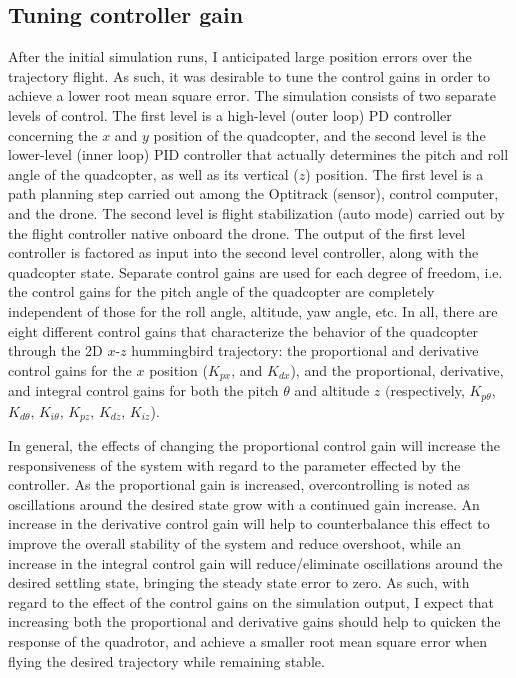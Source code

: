 \subsection{Tuning controller gain} %
After the initial simulation runs, I anticipated large position errors over the trajectory flight. As such, it was desirable to tune the control gains in order to achieve a lower root mean square error. The simulation consists of two separate levels of control. The first level is a high-level (outer loop) PD controller concerning the $x$ and $y$ position of the quadcopter, and the second level is the lower-level (inner loop) PID controller that actually determines the pitch and roll angle of the quadcopter, as well as its vertical ($z$) position. The first level is a path planning step carried out among the Optitrack (sensor), control computer, and the drone.  The second level is flight stabilization (auto mode) carried out by the flight controller native onboard the drone. The output of the first level controller is factored as input into the second level controller, along with the quadcopter state. Separate control gains are used for each degree of freedom, i.e. the control gains for the pitch angle of the quadcopter are completely independent of those for the roll angle, altitude, yaw angle, etc. In all, there are eight different control gains that characterize the behavior of the quadcopter through the 2D $x$-$z$ hummingbird trajectory: the proportional and derivative control gains for the $x$ position ($K_{px}$, and $K_{dx}$), and the proportional, derivative, and integral control gains for both the pitch $\theta$ and altitude $z$ $($respectively, $K_{p\theta}$, $K_{d\theta}$, $K_{i\theta}$, $K_{pz}$, $K_{dz}$, $K_{iz}$). 

In general, the effects of changing the proportional control gain will increase the responsiveness of the system with regard to the parameter effected by the controller. As the proportional gain is increased, overcontrolling is noted as oscillations around the desired state grow with a continued gain increase. An increase in the derivative control gain will help to counterbalance this effect to improve the overall stability of the system and reduce overshoot, while an increase in the integral control gain will reduce/eliminate oscillations around the desired settling state, bringing the steady state error to zero. As such, with regard to the effect of the control gains on the simulation output, I expect that increasing both the proportional and derivative gains should help to quicken the response of the quadrotor, and achieve a smaller root mean square error when flying the desired trajectory while remaining stable.


